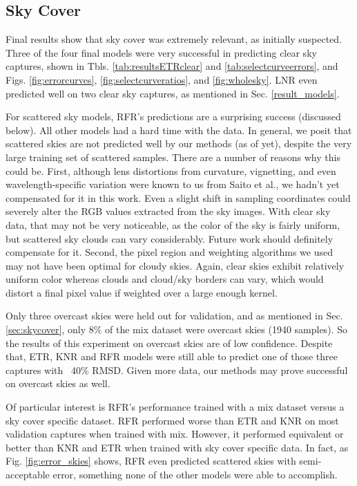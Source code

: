\subsection{Sky Cover}

Final results show that sky cover was extremely relevant, as initially suspected. Three of the four final models were very successful in predicting clear sky captures, shown in Tbls. \ref{tab:resultsETRclear} and \ref{tab:selectcurveerrors}, and Figs. \ref{fig:errorcurves}, \ref{fig:selectcurveratios}, and \ref{fig:wholesky}. LNR even predicted well on two clear sky captures, as mentioned in Sec. \ref{result_models}.

For scattered sky models, RFR's predictions are a surprising success (discussed below). All other models had a hard time with the data. In general, we posit that scattered skies are not predicted well by our methods (as of yet), despite the very large training set of scattered samples. There are a number of reasons why this could be. First, although lens distortions from curvature, vignetting, and even wavelength-specific variation were known to us from Saito et al.,\cite{saito_estimation_2016} we hadn't yet compensated for it in this work. Even a slight shift in sampling coordinates could severely alter the RGB values extracted from the sky images. With clear sky data, that may not be very noticeable, as the color of the sky is fairly uniform, but scattered sky clouds can vary considerably. Future work should definitely compensate for it. Second, the pixel region and weighting algorithms we used may not have been optimal for cloudy skies. Again, clear skies exhibit relatively uniform color whereas clouds and cloud/sky borders can vary, which would distort a final pixel value if weighted over a large enough kernel.

Only three overcast skies were held out for validation, and as mentioned in Sec. \ref{sec:skycover}, only 8\% of the mix dataset were overcast skies (1940 samples). So the results of this experiment on overcast skies are of low confidence. Despite that, ETR, KNR and RFR models were still able to predict one of those three captures with ~40\% RMSD. Given more data, our methods may prove successful on overcast skies as well.

Of particular interest is RFR's performance trained with a mix dataset versus a sky cover specific dataset. RFR performed worse than ETR and KNR on most validation captures when trained with mix. However, it performed equivalent or better than KNR and ETR when trained with sky cover specific data. In fact, as Fig. \ref{fig:error_skies} shows, RFR even predicted scattered skies with semi-acceptable error, something none of the other models were able to accomplish.

